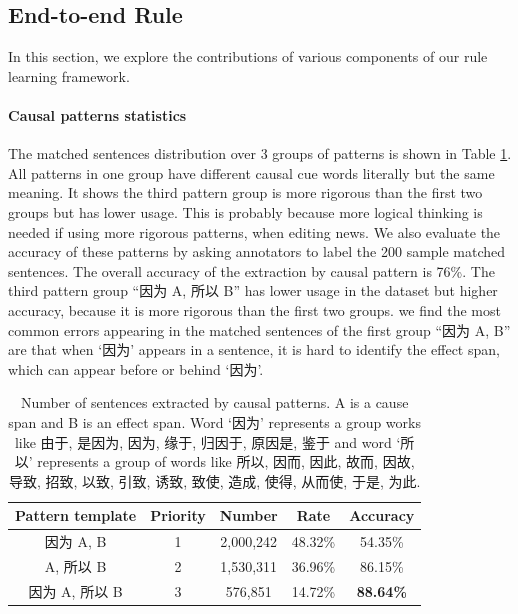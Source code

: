 \subsection{End-to-end Rule}
\label{sec:end-to-end_rule}
In this section, we explore the contributions of various components of our rule learning framework.
\paragraph{Causal patterns statistics} The matched sentences distribution over 3 groups of patterns is shown in Table \ref{tab:pattern_statistics}. All patterns in one group have different causal cue words literally but the same meaning. It shows the third pattern group is more rigorous than the first two groups but has lower usage. This is probably because more logical thinking is needed if using more rigorous patterns, when editing news.
We also evaluate the accuracy of these patterns by asking annotators to label the 200 sample matched sentences. The overall accuracy of the extraction by causal pattern is 76\%.
The third pattern group ``因为 A, 所以 B'' has lower usage in the dataset but higher accuracy, because it is more rigorous than the first two groups.
we find the most common errors appearing in the matched sentences of the first group ``因为 A, B'' are that when `因为' appears in a sentence, it is hard to identify the effect span, which can appear before or behind `因为'.
 
\begin{table}[htbp]
\caption{Number of sentences extracted by causal patterns. A is a cause span and B is an effect span. Word `因为' represents a group works like 由于, 是因为, 因为, 缘于, 归因于, 原因是, 鉴于 and word `所以' represents a group of words like 所以, 因而, 因此, 故而, 因故, 导致, 招致, 以致, 引致, 诱致, 致使, 造成, 使得, 从而使, 于是, 为此.}
\label{tab:pattern_statistics}
\centering
\begin{tabular}{|c|c|c|c|c|} \hline
	\textbf{Pattern template}& \textbf{Priority}&\textbf{Number}& \textbf{Rate}& \textbf{Accuracy}\\	\hline 
	因为 A, B&1&2,000,242&48.32\% & 54.35\%\\ \hline 
	A, 所以 B&2&1,530,311&36.96\% &86.15\%\\ \hline 
	因为 A, 所以 B&3&576,851&14.72\% &\textbf{88.64\%}\\ \hline
\end{tabular}
\end{table}	

